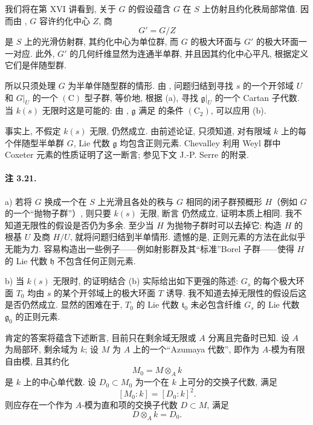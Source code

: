 我们将在第 XVI 讲看到, 关于 \(G\) 的假设蕴含 \(G\) 在 \(S\) 上仿射且约化秩局部常值. 因而由 \textup{}, \(G\) 容许约化中心 \(Z\), 商
\[
  G'=G/Z
\]
是 \(S\) 上的光滑仿射群, 其约化中心为单位群, 而 \(G\) 的极大环面与 \(G'\) 的极大环面一一对应. 此外, \(G'\) 的几何纤维显然为连通半单群, 并且因其约化中心平凡, 根据定义它们是伴随型群.

所以只须处理 \(G\) 为半单伴随型群的情形. 由 , 问题归结到寻找 \(s\) 的一个开邻域 \(U\) 和 \(G|_U\) 的一个 \((\mathrm C)\) 型子群, 等价地, 根据 \textup{(a)}, 寻找 \(\mathfrak g|_U\) 的一个 Cartan 子代数. 当 \(k(s)\) 无限时这是可能的: 由 , \(\mathfrak g\) 满足  的条件 \((\mathrm C_2)\), 可以应用 \textup{(b)}.

事实上, 不假定 \(k(s)\) 无限,  仍然成立. 由前述论证, 只须知道, 对有限域 \(k\) 上的每个伴随型半单群 \(G\), Lie 代数 \(\mathfrak g\) 均包含正则元素. Chevalley 利用 Weyl 群中 Coxeter 元素的性质证明了这一断言; 参见下文 J.-P. Serre 的附录.

\paragraph{\textbf{注 3.21.}}
\textup{a)}
若将 \(G\) 换成一个在 \(S\) 上光滑且各处的秩与 \(G\) 相同的闭子群预概形 \(H\)\textup{（例如 \(G\) 的一个“抛物子群”）}, 则只要 \(k(s)\) 无限, 断言  仍然成立, 证明本质上相同. 我不知道无限性的假设是否仍为多余. 至少当 \(H\) 为抛物子群时可以去掉它: 构造 \(H\) 的根基 \(U\) 及商 \(H/U\), 就将问题归结到半单情形. 遗憾的是, 正则元素的方法在此似乎无能为力. 容易构造出一些例子——例如射影群及其“标准”Borel 子群——使得 \(H\) 的 Lie 代数 \(\mathfrak h\) 不包含任何正则元素.

\smallskip
\noindent
\textup{b)}
当 \(k(s)\) 无限时,  的证明结合 \textup{(b)} 实际给出如下更强的陈述: \(G_s\) 的每个极大环面 \(T_0\) 均由 \(s\) 的某个开邻域上的极大环面 \(T\) 诱导. 我不知道去掉无限性的假设后这是否仍然成立. 显然的困难在于, \(T_0\) 的 Lie 代数 \(\mathfrak t_0\) 未必包含纤维 \(G_s\) 的 Lie 代数 \(\mathfrak g_0\) 的正则元素.

肯定的答案将蕴含下述断言, 目前只在剩余域无限或 \(A\) 分离且完备时已知. 设 \(A\) 为局部环, 剩余域为 \(k\); 设 \(M\) 为 \(A\) 上的一个“Azumaya 代数”, 即作为 \(A\)-模为有限自由模, 且其约化
\[
  M_0=M\otimes_A k
\]
是 \(k\) 上的中心单代数. 设 \(D_0\subset M_0\) 为一个在 \(k\) 上可分的交换子代数, 满足
\[
  [M_0:k]=[D_0:k]^2.
\]
则应存在一个作为 \(A\)-模为直和项的交换子代数 \(D\subset M\), 满足
\[
  D\otimes_A k=D_0.
\]

